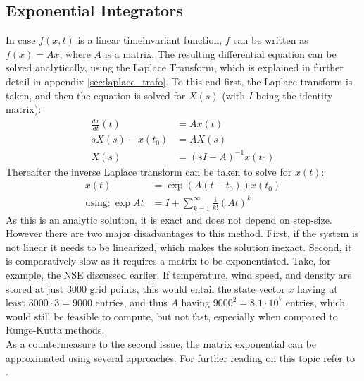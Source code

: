 \subsection{Exponential Integrators}
In case $f(x,t)$ is a linear timeinvariant function, $f$ can be written as $f(x)=Ax$, where $A$ is a matrix.
The resulting differential equation can be solved analytically, using the Laplace Transform, which is explained in further detail in appendix \ref{sec:laplace_trafo}.
To this end first, the Laplace transform is taken, and then the equation is solved for $X(s)$ (with $I$ being the identity matrix):
\begin{align*}
\frac{dx}{dt}(t) &= Ax(t)\\ 
sX(s) - x(t_0) &= AX(s)\\
X(s) &= (sI-A)^{-1}x(t_0)
\end{align*}
Thereafter the inverse Laplace transform can be taken to solve for $x(t)$:
\begin{align*}
x(t) &= \exp (A (t-t_0))x(t_0)\\
\text{using:}~ \exp{At} &= I + \sum_{k=1}^{\infty}\frac{1}{k!}(At)^k
\end{align*}
As this is an analytic solution, it is exact and does not depend on step-size.
However there are two major disadvantages to this method.
First, if the system is not linear it needs to be linearized, which makes the solution inexact.
Second, it is comparatively slow as it requires a matrix to be exponentiated.
Take, for example, the NSE discussed earlier.
If temperature, wind speed, and density are stored at just 3000 grid points, this would entail the state vector $x$ having at least $3000\cdot 3=9000$ entries, and thus $A$ having $9000^2=8.1\cdot 10^7$ entries, which would still be feasible to compute, but not fast, especially when compared to Runge-Kutta methods.\\
As a countermeasure to the second issue, the matrix exponential can be approximated using several approaches.
For further reading on this topic refer to \cite{moler2003nineteen}.


